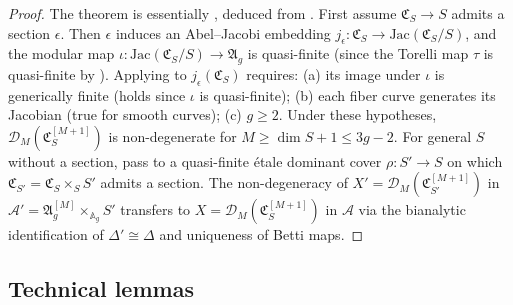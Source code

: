\begin{proof}
  The theorem is essentially \cite[Theorem~1.2']{GaoBettiRank}, deduced from
  \cite[Theorem~1.3]{GaoBettiRank}.
  First assume \(\mathfrak{C}_S \to S\) admits a section \(\epsilon\).
  Then \(\epsilon\) induces an Abel--Jacobi embedding
  \(j_\epsilon \colon \mathfrak{C}_S \to \mathrm{Jac}(\mathfrak{C}_S/S)\),
  and the modular map \(\iota \colon \mathrm{Jac}(\mathfrak{C}_S/S) \to \mathfrak{A}_g\)
  is quasi-finite (since the Torelli map \(\tau\) is quasi-finite by
  \cite[Lemma~1.11]{OortSteenbrink}).
  Applying \cite[Theorem~1.3(ii)]{GaoBettiRank} to \(j_\epsilon(\mathfrak{C}_S)\)
  requires: (a) its image under \(\iota\) is generically finite (holds since \(\iota\) is quasi-finite);
  (b) each fiber curve generates its Jacobian (true for smooth curves); (c) \(g \ge 2\).
  Under these hypotheses, \(\mathscr{D}_M(\mathfrak{C}_S^{[M+1]})\) is non-degenerate
  for \(M \ge \dim S + 1 \le 3g - 2\).
  For general \(S\) without a section, pass to a quasi-finite étale dominant cover
  \(\rho \colon S' \to S\) on which \(\mathfrak{C}_{S'} = \mathfrak{C}_S \times_S S'\)
  admits a section. The non-degeneracy of
  \(X' = \mathscr{D}_M(\mathfrak{C}_{S'}^{[M+1]})\)
  in \(\mathcal{A}' = \mathfrak{A}_g^{[M]} \times_{\mathbb{A}_g} S'\) transfers
  to \(X = \mathscr{D}_M(\mathfrak{C}_S^{[M+1]})\) in \(\mathcal{A}\)
  via the bianalytic identification of \(\Delta' \cong \Delta\) and uniqueness of
  Betti maps.
\end{proof}

\subsection{Technical lemmas}

